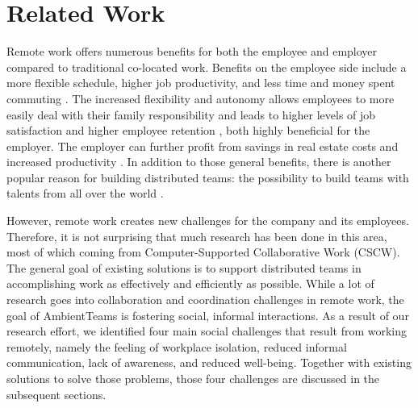 \chapter{Related Work}
\label{chapter:related_work}
Remote work offers numerous benefits for both the employee and employer compared to traditional co-located work. Benefits on the employee side include a more flexible schedule, higher job productivity, and less time and money spent commuting \autocite{flores2019understanding, mulki2009set}. The increased flexibility and autonomy allows employees to more easily deal with their family responsibility and leads to higher levels of job satisfaction and higher employee retention \autocite{mulki2009set, gajendran2007good, madsen2011benefits}, both highly beneficial for the employer. The employer can further profit from savings in real estate costs and increased productivity \autocite{mulki2009set}. In addition to those general benefits, there is another popular reason for building distributed teams: the possibility to build teams with talents from all over the world \autocite{carmel1999global}.

However, remote work creates new challenges for the company and its employees. Therefore, it is not surprising that much research has been done in this area, most of which coming from Computer-Supported Collaborative Work (CSCW). The general goal of existing solutions is to support distributed teams in accomplishing work as effectively and efficiently as possible. While a lot of research goes into collaboration and coordination challenges in remote work, the goal of AmbientTeams is fostering social, informal interactions. As a result of our research effort, we identified four main social challenges that result from working remotely, namely the feeling of workplace isolation, reduced informal communication, lack of awareness, and reduced well-being. Together with existing solutions to solve those problems, those four challenges are discussed in the subsequent sections.



